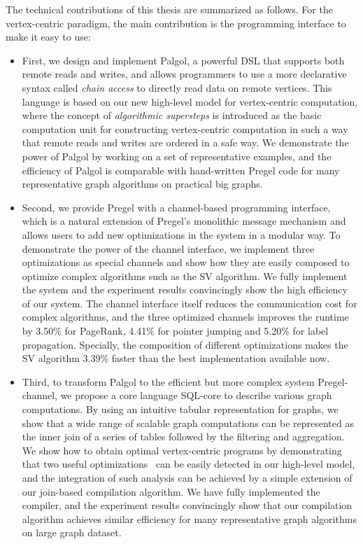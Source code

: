 \documentclass{sokendai_thesis} %
\begin{document}
The technical contributions of this thesis are summarized as follows.
For the vertex-centric paradigm, the main contribution is the programming interface to make it easy to use:
\begin{itemize}
\item
  First, we design and implement Palgol, a powerful DSL that supports both remote reads and writes, and allows programmers to use a more declarative syntax called \emph{chain access} to directly read data on remote vertices.
  This language is based on our new high-level model for vertex-centric computation, where the concept of \emph{algorithmic supersteps} is introduced as the basic computation unit for constructing vertex-centric computation in such a way that remote reads and writes are ordered in a safe way.
  We demonstrate the power of Palgol by working on a set of representative examples, and the efficiency of Palgol is comparable with hand-written Pregel code for many representative graph algorithms on practical big graphs.

\item
  Second, we provide Pregel with a channel-based programming interface, which is a natural extension of Pregel's monolithic message mechanism and allows users to add new optimizations in the system in a modular way.
  To demonstrate the power of the channel interface, we implement three optimizations as special channels and show how they are easily composed to optimize complex algorithms such as the SV algorithm.
  We fully implement the system and the experiment results convincingly show the high efficiency of our system.
  The channel interface itself reduces the communication cost for complex algorithms, and the three optimized channels improves the runtime by 3.50$\%$ for PageRank, 4.41$\%$ for pointer jumping and 5.20$\%$ for label propagation.
  Specially, the composition of different optimizations makes the SV algorithm 3.39$\%$ faster than the best implementation available now.

\item
  Third, to transform Palgol to the efficient but more complex system Pregel-channel, we propose a core language SQL-core to describe various graph computations.
  By using an intuitive tabular representation for graphs, we show that a wide range of scalable graph computations can be represented as the inner join of a series of tables followed by the filtering and aggregation.
  We show how to obtain optimal vertex-centric programs by demonstrating that two useful optimizations~\cite{yan2015effective,zhang2019composing} can be easily detected in our high-level model, and the integration of such analysis can be achieved by a simple extension of our join-based compilation algorithm.
  We have fully implemented the compiler, and the experiment results convincingly show that our compilation algorithm achieves similar efficiency for many representative graph algorithms on large graph dataset.
\end{itemize}
\end{document}
